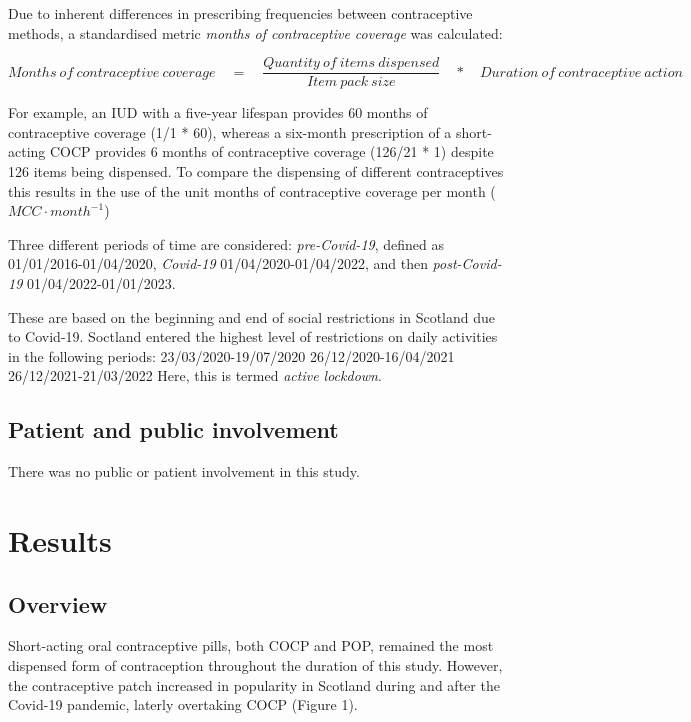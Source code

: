 \documentclass[
]{article}
\begin{document}
Due to inherent differences in prescribing frequencies between
contraceptive methods, a standardised metric \emph{months of
contraceptive coverage} was calculated:

\[Months\ of\ contraceptive\ coverage\quad =\quad \frac{Quantity\ of\ items\ dispensed}{Item\ pack\ size}\quad *\quad Duration\ of\ contraceptive\ action\]

For example, an IUD with a five-year lifespan provides 60 months of
contraceptive coverage (1/1 * 60), whereas a six-month prescription of a
short-acting COCP provides 6 months of contraceptive coverage (126/21 *
1) despite 126 items being dispensed. To compare the dispensing of
different contraceptives this results in the use of the unit months of
contraceptive coverage per month (\(MCC \cdot month^{-1}\))

Three different periods of time are considered: \emph{pre-Covid-19},
defined as 01/01/2016-01/04/2020, \emph{Covid-19} 01/04/2020-01/04/2022,
and then \emph{post-Covid-19} 01/04/2022-01/01/2023.

These are based on the beginning and end of social restrictions in
Scotland due to Covid-19. Soctland entered the highest level of
restrictions on daily activities in the following periods:
23/03/2020-19/07/2020 26/12/2020-16/04/2021 26/12/2021-21/03/2022 Here,
this is termed \emph{active lockdown}.

\hypertarget{patient-and-public-involvement}{%
\subsection{Patient and public
involvement}\label{patient-and-public-involvement}}

There was no public or patient involvement in this study.

\hypertarget{results}{%
\section{Results}\label{results}}

\hypertarget{overview}{%
\subsection{Overview}\label{overview}}

Short-acting oral contraceptive pills, both COCP and POP, remained the
most dispensed form of contraception throughout the duration of this
study. However, the contraceptive patch increased in popularity in
Scotland during and after the Covid-19 pandemic, laterly overtaking COCP
(Figure 1).
\end{document}

